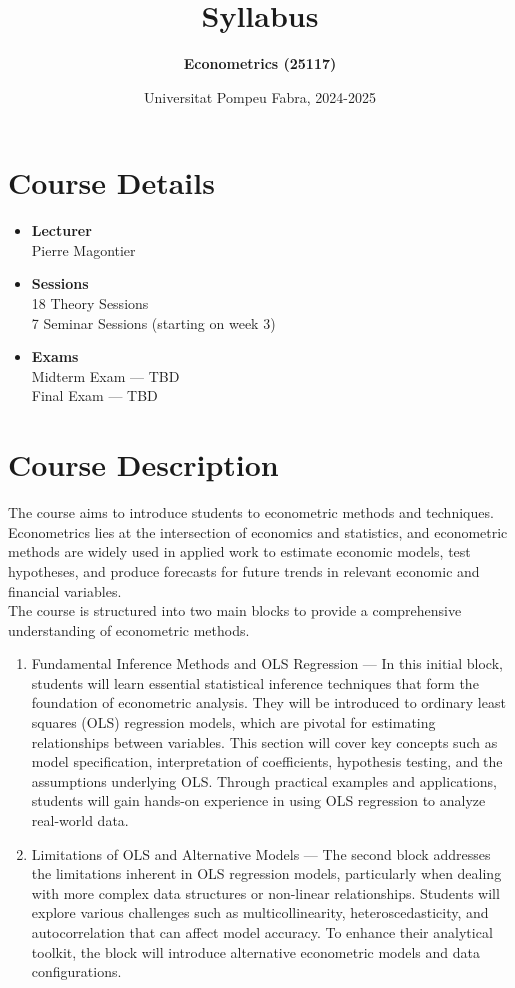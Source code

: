 \documentclass[12pt]{article}
\title{\textbf{Syllabus}}
\author{\textbf{Econometrics (25117)}}
\date{Universitat Pompeu Fabra, 2024-2025}
\begin{document}
\maketitle

\section*{Course Details}
\begin{itemize}
    \item \textbf{Lecturer}\\
    Pierre Magontier
    \item \textbf{Sessions}\\
    18 Theory Sessions\\
    7 Seminar Sessions (starting on week 3)
    \item \textbf{Exams}\\
    Midterm Exam --- TBD\\
    Final Exam --- TBD
\end{itemize}
\section*{Course Description}
The course aims to introduce students to econometric methods and techniques. Econometrics lies at the intersection of economics and statistics, and econometric methods are widely used in applied work to estimate economic models, test hypotheses, and produce forecasts for future trends in relevant economic and financial variables.\\

The course is structured into two main blocks to provide a comprehensive understanding of econometric methods.

\begin{enumerate}
    \item Fundamental Inference Methods and OLS Regression --- In this initial block, students will learn essential statistical inference techniques that form the foundation of econometric analysis. They will be introduced to ordinary least squares (OLS) regression models, which are pivotal for estimating relationships between variables. This section will cover key concepts such as model specification, interpretation of coefficients, hypothesis testing, and the assumptions underlying OLS. Through practical examples and applications, students will gain hands-on experience in using OLS regression to analyze real-world data.
    \item Limitations of OLS and Alternative Models --- The second block addresses the limitations inherent in OLS regression models, particularly when dealing with more complex data structures or non-linear relationships. Students will explore various challenges such as multicollinearity, heteroscedasticity, and autocorrelation that can affect model accuracy. To enhance their analytical toolkit, the block will introduce alternative econometric models and data configurations.
\end{enumerate}
\end{document}

